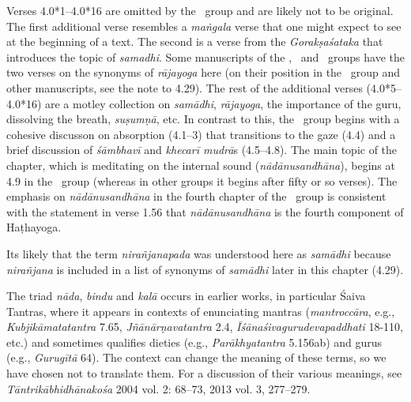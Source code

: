 \begin{ekdosis}
\begin{philcomm}[hp04_000_1]
Verses 4.0*1–4.0*16 are omitted by the \textalpha\ group and are likely not to be original. The first additional verse resembles a \emph{maṅgala} verse that one might expect to see at the beginning of a text. The second is a verse from the \emph{Gorakṣaśataka} that introduces the topic of \emph{samadhi}. Some manuscripts of the \textbeta, \textepsilon\ and \texteta\ groups have the two verses on the synonyms of \emph{rājayoga} here (on their position in the \textalpha\ group and other manuscripts, see the note to 4.29). The rest of the additional verses (4.0*5–4.0*16) are a motley collection on \emph{samādhi}, \emph{rājayoga}, the importance of the guru, dissolving the breath, \emph{suṣumṇā}, etc. In contrast to this, the \textalpha\ group begins with a cohesive discusson on absorption (4.1–3) that transitions to the gaze (4.4) and a brief discussion of \emph{śāmbhavī} and \emph{khecarī mudrā}s (4.5–4.8). The main topic of the chapter, which is meditating on the internal sound (\emph{nādānusandhāna}), begins at 4.9 in the \textalpha\ group (whereas in other groups it begins after fifty or so verses). The emphasis on \emph{nādānusandhāna} in the fourth chapter of the \textalpha\ group is consistent with the statement in verse 1.56 that \emph{nādānusandhāna} is the fourth component of Haṭhayoga.

Its likely that the term \emph{nirañjanapada} was understood here as \emph{samādhi} because \emph{nirañjana} is included in a list of synonyms of \emph{samādhi} later in this chapter (4.29).

The triad \emph{nāda}, \emph{bindu} and \emph{kalā} occurs in earlier works, in particular Śaiva Tantras, where it appears in contexts of enunciating mantras (\emph{mantroccāra}, e.g., \emph{Kubjikāmatatantra} 7.65, \emph{Jñānārṇavatantra} 2.4, \emph{Īśānaśivagurudevapaddhati} 18-110, etc.) and sometimes qualifies dieties (e.g., \emph{Parākhyatantra} 5.156ab) and gurus (e.g., \emph{Gurugītā} 64). The context can change the meaning of these terms, so we have chosen not to translate them. For a discussion of their various meanings, see \emph{Tāntrikābhidhānakośa} 2004 vol. 2: 68–73, 2013 vol. 3, 277–279.  


\end{philcomm}


\end{ekdosis}

